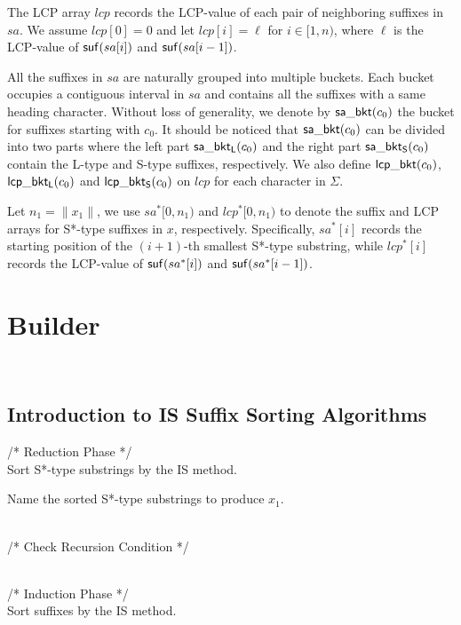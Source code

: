 \documentclass[10pt,journal,compsoc]{IEEEtran}
\begin{document}
The LCP array $lcp$ records the LCP-value of each pair of neighboring suffixes in $sa$. We assume $lcp[0] = 0$ and let $lcp[i] = \ell$ for $i \in [1, n)$, where $\ell$ is the LCP-value of ${\sf suf}(sa[i])$ and ${\sf suf}(sa[i - 1])$.

All the suffixes in $sa$ are naturally grouped into multiple buckets. Each bucket occupies a contiguous interval in $sa$ and contains all the suffixes with a same heading character. Without loss of generality, we denote by ${\sf sa\_bkt}(c_0)$ the bucket for suffixes starting with $c_0$. It should be noticed that ${\sf sa\_bkt}(c_0)$ can be divided into two parts where the left part ${\sf sa\_bkt_L}(c_0)$ and the right part ${\sf sa\_bkt_S}(c_0)$ contain the L-type and S-type suffixes, respectively. We also define ${\sf lcp\_bkt}(c_0)$, ${\sf lcp\_bkt_L}(c_0)$ and ${\sf lcp\_bkt_S}(c_0)$ on $lcp$ for each character in $\Sigma$.

Let $n_1 = \|x_1\|$, we use $sa^*[0, n_1)$ and $lcp^*[0, n_1)$ to denote the suffix and LCP arrays for S*-type suffixes in $x$, respectively. Specifically, $sa^*[i]$ records the starting position of the $(i + 1)$-th smallest S*-type substring, while $lcp^*[i]$ records the LCP-value of ${\sf suf}(sa^*[i])$ and ${\sf suf}(sa^*[i - 1])$.


\section{Builder}~\label{sec:builder}

\subsection{Introduction to IS Suffix Sorting Algorithms} \label{subsec:improvement}

\begin{algorithm}
	\SetAlgoNoLine
	
	/* Reduction Phase */ \\
	Sort S*-type substrings by the IS method. \label{alg:1:ref:1}
	
	Name the sorted S*-type substrings to produce $x_1$. \label{alg:1:ref:2}
	
	~\\
	
	/* Check Recursion Condition */ \\	
	
	~\\
	
	/* Induction Phase */ \\
	Sort suffixes by the IS method.  \label{alg:1:ref:5}
	
	
	\caption{The Framework of an IS suffix sorting algorithm.}
	
	\label{alg:1}
\end{algorithm}
\end{document}
